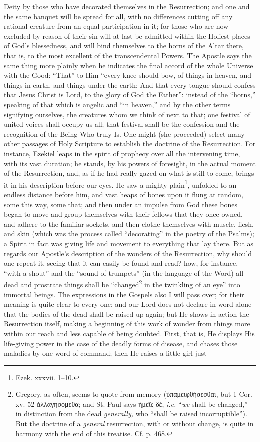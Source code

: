 Deity by those who have decorated themselves in the Resurrection; and one and the same banquet will be spread for all, with no differences cutting off any rational creature from an equal participation in it; for those who are now excluded by reason of their sin will at last be admitted within the Holiest places of God’s blessedness, and will bind themselves to the horns of the Altar there, that is, to the most excellent of the transcendental Powers. The Apostle says the same thing more plainly when he indicates the final accord of the whole Universe with the Good: “That” to Him “every knee should bow, of things in heaven, and things in earth, and things under the earth: And that every tongue should confess that Jesus Christ is Lord, to the glory of God the Father”: instead of the “horns,” speaking of that which is angelic and “in heaven,” and by the other terms signifying ourselves, the creatures whom we think of next to that; one festival of united voices shall occupy us all; that festival shall be the confession and the recognition of the Being Who truly Is. One might (she proceeded) select many other passages of Holy Scripture to establish the doctrine of the Resurrection. For instance, Ezekiel leaps in the spirit of prophecy over all the intervening time, with its vast duration; he stands, by his powers of foresight, in the actual moment of the Resurrection, and, as if he had really gazed on what is still to come, brings it in his description before our eyes. He saw a mighty plain\footnote{Ezek. xxxvii. 1–10.}, unfolded to an endless distance before him, and vast heaps of bones upon it flung at random, some this way, some that; and then under an impulse from God these bones began to move and group themselves with their fellows that they once owned, and adhere to the familiar sockets, and then clothe themselves with muscle, flesh, and skin (which was the process called “decorating” in the poetry of the Psalms); a Spirit in fact was giving life and movement to everything that lay there. But as regards our Apostle’s description of the wonders of the Resurrection, why should one repeat it, seeing that it can easily be found and read? how, for instance, “with a shout” and the “sound of trumpets” (in the language of the Word) all dead and prostrate things shall be “changed\footnote{Gregory, as often, seems to quote from memory (\textgreek{ὑπαμειφθήσεσθαι}, but 1 Cor. xv. 52 \textgreek{ἀλλαγησόμεθα}; and St. Paul says \textgreek{ἡμεῖς δὲ}, \emph{i.e.} “\emph{we} shall be changed,” in distinction from the dead \emph{generally,} who “shall be raised incorruptible”). But the doctrine of a \emph{general} resurrection, with or without change, is quite in harmony with the end of this treatise. Cf. p. 468.} in the twinkling of an eye” into immortal beings. The expressions in the Gospels also I will pass over; for their meaning is quite clear to every one; and our Lord does not declare in word alone that the bodies of the dead shall be raised up again; but He shows in action the Resurrection itself, making a beginning of this work of wonder from things more within our reach and less capable of being doubted. First, that is, He displays His life-giving power in the case of the deadly forms of disease, and chases those maladies by one word of command; then He raises a little girl just 